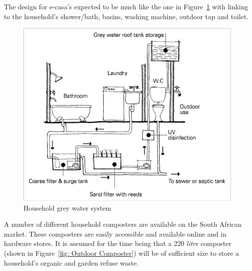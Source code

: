 \documentclass[a4paper,11pt,fleqn]{report}
\begin{document}
The design for \ac{e-casa}'s expected to be much like the one in Figure~\ref{fig: Grey water system} with linking to the household's shower/bath, basins, washing machine, outdoor tap and toilet.
%
\begin{figure}[h!]
\begin{center}
\includegraphics[scale = 1.15]{Household_Grey_Water.png}
\caption{Household grey water system}
\label{fig: Grey water system}
\end{center}
\end{figure}
%
A number of different household composters are available on the South African market. These composters are easily accessible and available online and in hardware stores. It is assumed for the time being that a 220 \textit{litre} composter (shown in Figure~\ref{fig: Outdoor Composter}) will be of sufficient size to store a household's organic and garden refuse waste.
%
\end{document}
